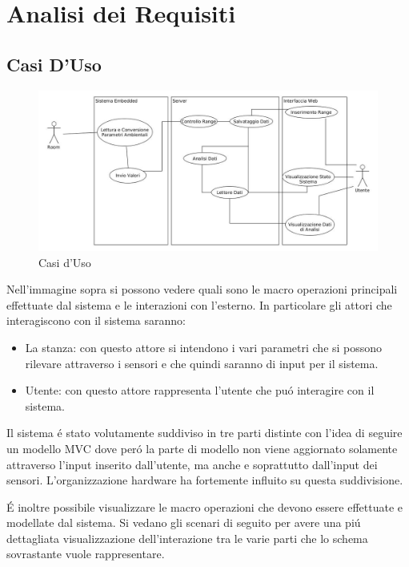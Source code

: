 \section{Analisi dei Requisiti}
\subsection{Casi D'Uso}

\begin{figure}[ht]
\centering
\includegraphics[width=\textwidth]{Figures/UseCases.jpg}
\caption{Casi d'Uso}
\end{figure}

Nell'immagine sopra si possono vedere quali sono le macro operazioni principali effettuate dal sistema e le interazioni con l'esterno. In particolare gli attori che interagiscono con il sistema saranno:

\begin{itemize}
  \item La stanza: con questo attore si intendono i vari parametri che si possono rilevare attraverso i sensori e che quindi saranno di input per il sistema.
  \item Utente: con questo attore rappresenta l'utente che pu\'o interagire con il sistema.
\end{itemize}

Il sistema \'e stato volutamente suddiviso in tre parti distinte con l'idea di seguire un modello MVC dove per\'o la parte di modello non viene aggiornato solamente attraverso l'input inserito dall'utente, ma anche e soprattutto dall'input dei sensori. L'organizzazione hardware ha fortemente influito su questa suddivisione.

\'E inoltre possibile visualizzare le macro operazioni che devono essere effettuate e modellate dal sistema. Si vedano gli scenari di seguito per avere una pi\'u dettagliata visualizzazione dell'interazione tra le varie parti che lo schema sovrastante vuole rappresentare.


